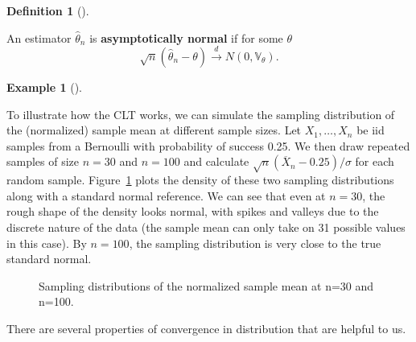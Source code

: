 \documentclass[
  13pt,
  letterpaper,
  DIV=11,
  numbers=noendperiod]{scrreprt}
\newcommand{\V}{\mathbb{V}}
\newcommand{\Xbar}{\overline{X}}
\newcommand{\indist}{\overset{d}{\to}}
\theoremstyle{definition}
\newtheorem{definition}{Definition}[chapter]
\theoremstyle{definition}
\newtheorem{example}{Example}[chapter]
\theoremstyle{plain}
\theoremstyle{remark}
\begin{document}
\begin{definition}[]\protect\hypertarget{def-asymptotically-normal}{}\label{def-asymptotically-normal}

An estimator \(\widehat{\theta}_n\) is \textbf{asymptotically normal} if
for some \(\theta\) \[
\sqrt{n}\left( \widehat{\theta}_n - \theta \right) \indist N\left(0,\V_{\theta}\right).
\]

\end{definition}

\begin{example}[]\protect\hypertarget{exm-bin-clt}{}\label{exm-bin-clt}

To illustrate how the CLT works, we can simulate the sampling
distribution of the (normalized) sample mean at different sample sizes.
Let \(X_1, \ldots, X_n\) be iid samples from a Bernoulli with
probability of success 0.25. We then draw repeated samples of size
\(n=30\) and \(n=100\) and calculate \(\sqrt{n}(\Xbar_n - 0.25)/\sigma\)
for each random sample. Figure~\ref{fig-clt} plots the density of these
two sampling distributions along with a standard normal reference. We
can see that even at \(n=30\), the rough shape of the density looks
normal, with spikes and valleys due to the discrete nature of the data
(the sample mean can only take on 31 possible values in this case). By
\(n=100\), the sampling distribution is very close to the true standard
normal.

\begin{figure}[th]


\caption{\label{fig-clt}Sampling distributions of the normalized sample
mean at n=30 and n=100.}

\end{figure}%

\end{example}

There are several properties of convergence in distribution that are
helpful to us.
\end{document}
